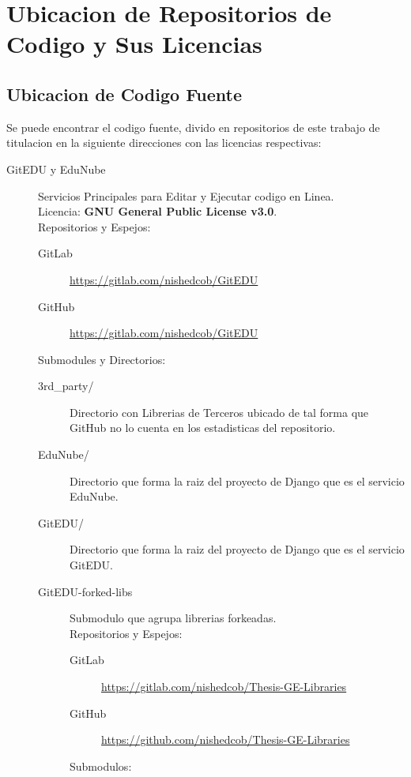 
\chapter{Ubicacion de Repositorios de Codigo y Sus Licencias}
\label{AnexoI} 

\section{Ubicacion de Codigo Fuente}
Se puede encontrar el codigo fuente, divido en repositorios de este trabajo de titulacion en la siguiente direcciones con las licencias respectivas:
\begin{description}
	\item[GitEDU y EduNube] Servicios Principales para Editar y Ejecutar codigo en Linea.\\
    Licencia: \textbf{GNU General Public License v3.0}. \\
    Repositorios y Espejos:
    \begin{description}
    	\item[GitLab] \url{https://gitlab.com/nishedcob/GitEDU}
        \item[GitHub] \url{https://gitlab.com/nishedcob/GitEDU}
    \end{description}
    Submodules y Directorios:
    \begin{description}
    	\item[3rd\_party/] Directorio con Librerias de Terceros ubicado de tal forma que GitHub no lo cuenta en los estadisticas del repositorio.
        \item[EduNube/] Directorio que forma la raiz del proyecto de Django que es el servicio EduNube.
        \item[GitEDU/] Directorio que forma la raiz del proyecto de Django que es el servicio GitEDU.
        \item[GitEDU-forked-libs] Submodulo que agrupa librerias forkeadas. \\
        Repositorios y Espejos:
        \begin{description}
        	\item[GitLab] \sloppy \url{https://gitlab.com/nishedcob/Thesis-GE-Libraries}
            \item[GitHub] \sloppy \url{https://github.com/nishedcob/Thesis-GE-Libraries}
        \end{description}
    	Submodulos:
        \begin{description}

\end{description}
\end{description}
\end{description}
